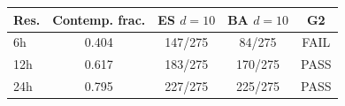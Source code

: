 \begin{tabular}{@{}lcccc@{}}
\toprule
Res. & Contemp. frac. & ES $d{=}10$ & BA $d{=}10$ & G2 \\
\midrule
6h & 0.404 & 147/275 & 84/275 & FAIL \\
12h & 0.617 & 183/275 & 170/275 & PASS \\
24h & 0.795 & 227/275 & 225/275 & PASS \\
\bottomrule
\end{tabular}
